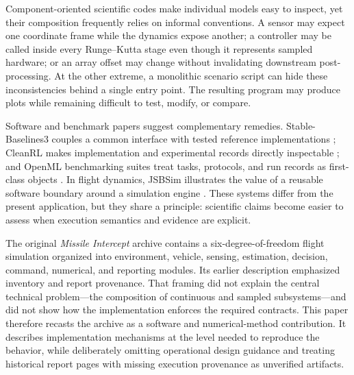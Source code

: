 \documentclass[11pt,a4paper]{article}
\begin{document}
Component-oriented scientific codes make individual models easy to inspect, yet their composition frequently relies on informal conventions. A sensor may expect one coordinate frame while the dynamics expose another; a controller may be called inside every Runge--Kutta stage even though it represents sampled hardware; or an array offset may change without invalidating downstream post-processing. At the other extreme, a monolithic scenario script can hide these inconsistencies behind a single entry point. The resulting program may produce plots while remaining difficult to test, modify, or compare.

Software and benchmark papers suggest complementary remedies. Stable-Baselines3 couples a common interface with tested reference implementations \citep{raffin2021}; CleanRL makes implementation and experimental records directly inspectable \citep{huang2022}; and OpenML benchmarking suites treat tasks, protocols, and run records as first-class objects \citep{bischl2021}. In flight dynamics, JSBSim illustrates the value of a reusable software boundary around a simulation engine \citep{berndt2026}. These systems differ from the present application, but they share a principle: scientific claims become easier to assess when execution semantics and evidence are explicit.

The original \emph{Missile Intercept} archive contains a six-degree-of-freedom flight simulation organized into environment, vehicle, sensing, estimation, decision, command, numerical, and reporting modules. Its earlier description emphasized inventory and report provenance. That framing did not explain the central technical problem---the composition of continuous and sampled subsystems---and did not show how the implementation enforces the required contracts. This paper therefore recasts the archive as a software and numerical-method contribution. It describes implementation mechanisms at the level needed to reproduce the behavior, while deliberately omitting operational design guidance and treating historical report pages with missing execution provenance as unverified artifacts.
\end{document}
